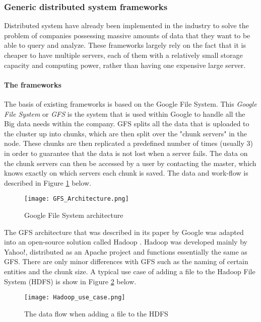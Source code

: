 \subsubsection{Generic distributed system frameworks}
Distributed system have already been implemented in the industry to solve the problem of companies possessing massive amounts of data that they want to be able to query and analyze. These frameworks largely rely on the fact that it is cheaper
to have multiple servers, each of them with a relatively small storage capacity and computing power, rather than having one expensive large server.

\paragraph{The frameworks}
The basis of existing frameworks is based on the Google File System\cite{Ghem03}. This \textit{Google File System} or \textit{GFS} is the system that is used within Google to handle all the Big data needs within the company. GFS splits all the data that is uploaded to the cluster up into chunks, which are then split over the "chunk servers" in the node. These chunks are then replicated a predefined number of times (usually 3) in order to guarantee that the data is not lost when a server fails. The data on the chunk servers can then be accessed by a user by contacting the master, which knows exactly on which servers each chunk is saved.\cite{Ghem03} The data and work-flow is described in Figure \ref{GFS_Architecture} below.

\begin{figure}
	\texttt{[image: GFS\_Architecture.png]}
	\caption{Google File System architecture\cite{Ghem03}}
	\label{GFS_Architecture}
\end{figure}

The GFS architecture that was described in its paper by Google was adapted into an open-source solution called Hadoop \cite{Shv10}. Hadoop was developed mainly by Yahoo!, distributed as an Apache project and functions essentially the same as GFS. There are only minor differences with GFS such as the naming of certain entities and the chunk size. A typical use case of adding a file to the Hadoop File System (HDFS) is show in Figure \ref{Hadoop_usecase} below.

\begin{figure}
	\texttt{[image: Hadoop\_use\_case.png]}
	\caption{The data flow when adding a file to the HDFS\cite{Shv10}}
	\label{Hadoop_usecase}
\end{figure}

